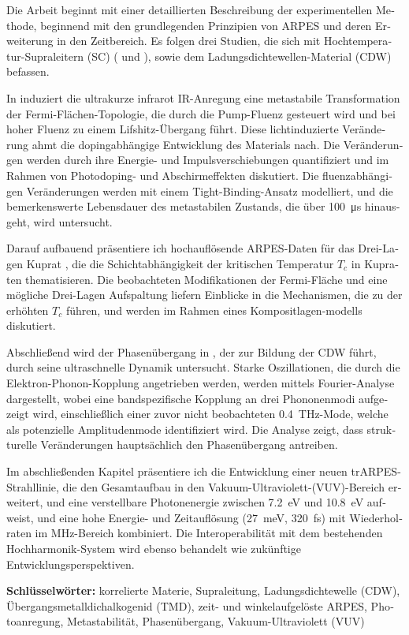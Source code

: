 \begin{otherlanguage}{german}
Die Arbeit beginnt mit einer detaillierten Beschreibung der experimentellen Methode, beginnend mit den grundlegenden Prinzipien von ARPES und deren Erweiterung in den Zeitbereich.
Es folgen drei Studien, die sich mit Hochtemperatur-Supraleitern (SC) ( und ), sowie dem Ladungsdichtewellen-Material (CDW)  befassen.

In  induziert die ultrakurze infrarot IR-Anregung eine metastabile Transformation der Fermi-Flächen-Topologie, die durch die Pump-Fluenz gesteuert wird und bei hoher Fluenz zu einem Lifshitz-Übergang führt.
Diese lichtinduzierte Veränderung ahmt die dopingabhängige Entwicklung des Materials nach.
Die Veränderungen werden durch ihre Energie- und Impulsverschiebungen quantifiziert und im Rahmen von Photodoping- und Abschirmeffekten diskutiert.
Die fluenzabhängigen Veränderungen werden mit einem Tight-Binding-Ansatz modelliert, und die bemerkenswerte Lebensdauer des metastabilen Zustands, die über \qty{100}{\micro\second} hinausgeht, wird untersucht.

Darauf aufbauend präsentiere ich hochauflösende ARPES-Daten für das Drei-Lagen Kuprat , die die Schichtabhängigkeit der kritischen Temperatur $T_c$ in Kupraten thematisieren.
Die beobachteten Modifikationen der Fermi-Fläche und eine mögliche Drei-Lagen Aufspaltung liefern Einblicke in die Mechanismen, die zu der erhöhten $T_c$ führen, und werden im Rahmen eines Kompositlagen-modells diskutiert.

Abschließend wird der Phasenübergang in , der zur Bildung der CDW führt, durch seine ultraschnelle Dynamik untersucht.
Starke Oszillationen, die durch die Elektron-Phonon-Kopplung angetrieben werden, werden mittels Fourier-Analyse dargestellt, wobei eine bandspezifische Kopplung an drei Phononenmodi aufgezeigt wird, einschließlich einer zuvor nicht beobachteten \qty{0.4}{\tera\hertz}-Mode, welche als potenzielle Amplitudenmode identifiziert wird.
Die Analyse zeigt, dass strukturelle Veränderungen hauptsächlich den Phasenübergang antreiben.

Im abschließenden Kapitel präsentiere ich die Entwicklung einer neuen trARPES-Strahllinie, die den Gesamtaufbau in den Vakuum-Ultraviolett-(VUV)-Bereich erweitert, und eine verstellbare Photonenergie zwischen \qty{7.2}{\electronvolt} und \qty{10.8}{\electronvolt} aufweist, und eine hohe Energie- und Zeitauflösung (\qty{27}{\milli\electronvolt}, \qty{320}{\femto\second}) mit Wiederholraten im \unit{\mega\hertz}-Bereich kombiniert.
Die Interoperabilität mit dem bestehenden Hochharmonik-System wird ebenso behandelt wie zukünftige Entwicklungsperspektiven.\hfill\break

\textbf{Schlüsselwörter:} korrelierte Materie, Supraleitung, Ladungsdichtewelle (CDW), Übergangsmetalldichalkogenid (TMD), zeit- und winkelaufgelöste ARPES, Photoanregung, Metastabilität, Phasenübergang, Vakuum-Ultraviolett (VUV)

\end{otherlanguage}




